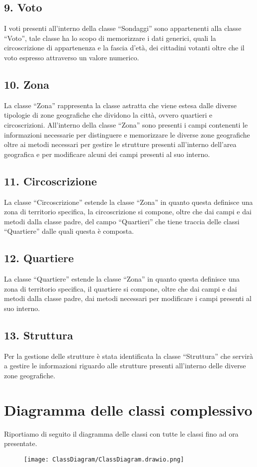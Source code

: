     \subsection*{9. Voto}
        I voti presenti all'interno della classe ``Sondaggi'' sono appartenenti alla classe ``Voto'', tale classe ha lo scopo di memorizzare i dati generici, quali la circoscrizione di appartenenza e la fascia d'età, dei cittadini votanti oltre che il voto espresso attraverso un valore numerico.

    \subsection*{10. Zona}
        La classe ``Zona'' rappresenta la classe astratta che viene estesa dalle diverse tipologie di zone geografiche che dividono la città, ovvero quartieri e circoscrizioni. All'interno della classe ``Zona'' sono presenti i campi contenenti le informazioni necessarie per distinguere e memorizzare le diverse zone geografiche oltre ai metodi necessari per gestire le strutture presenti all'interno dell'area geografica e per modificare alcuni dei campi presenti al suo interno.

    \subsection*{11. Circoscrizione}
        La classe ``Circoscrizione'' estende la classe ``Zona'' in quanto questa definisce una zona di territorio specifica, la circoscrizione si compone, oltre che dai campi e dai metodi dalla classe padre, del campo ``Quartieri'' che tiene traccia delle classi ``Quartiere'' dalle quali questa è composta.
    
    \subsection*{12. Quartiere}
        La classe ``Quartiere'' estende la classe ``Zona'' in quanto questa definisce una zona di territorio specifica, il quartiere si compone, oltre che dai campi e dai metodi dalla classe padre, dai metodi necessari per modificare i campi presenti al suo interno.
    
    \subsection*{13. Struttura}
        Per la gestione delle strutture è stata identificata la classe ``Struttura'' che servirà a gestire le informazioni riguardo alle strutture presenti all'interno delle diverse zone geografiche.

\newpage
\section{Diagramma delle classi complessivo}
    Riportiamo di seguito il diagramma delle classi con tutte le classi fino ad ora presentate.
    \begin{figure}[H]
        \centering
        \texttt{[image: ClassDiagram/ClassDiagram.drawio.png]}
    \end{figure}